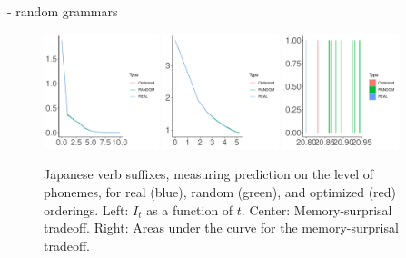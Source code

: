 - random grammars


\begin{figure}
	\begin{center}
\includegraphics[width=0.3\textwidth]{figures/Japanese-suffixes-byPhonemes-it.pdf}
\includegraphics[width=0.3\textwidth]{figures/Japanese-suffixes-byPhonemes-memsurp.pdf}
\includegraphics[width=0.3\textwidth]{figures/Japanese-suffixes-byPhonemes-auc.pdf}
\end{center}
	\caption{Japanese verb suffixes, measuring prediction on the level of phonemes, for real (blue), random (green), and optimized (red) orderings. Left: $I_t$ as a function of $t$. Center: Memory-surprisal tradeoff. Right: Areas under the curve for the memory-surprisal tradeoff.}\label{fig:jap-phon}
\end{figure}


